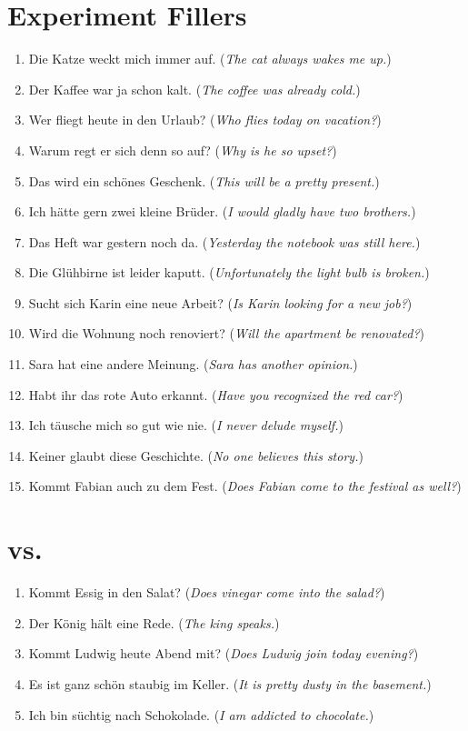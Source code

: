 \section*{Experiment Fillers}
\begin{enumerate}[resume]
	\item Die Katze weckt mich immer auf. (\textit{The cat always wakes me up.})
	\item Der Kaffee war ja schon kalt. (\textit{The coffee was already cold.})
	\item Wer fliegt heute in den Urlaub? (\textit{Who flies today on vacation?})
	\item Warum regt er sich denn so auf? (\textit{Why is he so upset?})
	\item Das wird ein schönes Geschenk. (\textit{This will be a pretty present.})
	\item Ich hätte gern zwei kleine Brüder. (\textit{I would gladly have two brothers.})
	\item Das Heft war gestern noch da. (\textit{Yesterday the notebook was still here.})
	\item Die Glühbirne ist leider kaputt. (\textit{Unfortunately the light bulb is  broken.})
	\item Sucht sich Karin eine neue Arbeit? (\textit{Is Karin looking for a new job?})
	\item Wird die Wohnung noch renoviert? (\textit{Will the apartment be renovated?})
	\item Sara hat eine andere Meinung. (\textit{Sara has another opinion.})
	\item Habt ihr das rote Auto erkannt. (\textit{Have you recognized the red car?})
	\item Ich täusche mich so gut wie nie. (\textit{I never delude myself.})
	\item Keiner glaubt diese Geschichte. (\textit{No one believes this story.})
	\item Kommt Fabian auch zu dem Fest. (\textit{Does Fabian come to the festival as well?})
\end{enumerate}

\section*{\textipa{[\c{c}]} vs.\ \textipa{[k]}}
\begin{enumerate}[resume]
	\item Kommt Essig in den Salat? (\textit{Does vinegar come into the salad?})
	\item Der König hält eine Rede. (\textit{The king speaks.})
	\item Kommt Ludwig heute Abend mit? (\textit{Does Ludwig join today evening?})
	\item Es ist ganz schön staubig im Keller. (\textit{It is pretty dusty in the basement.})
	\item Ich bin süchtig nach Schokolade. (\textit{I am addicted to chocolate.})
\end{enumerate}

